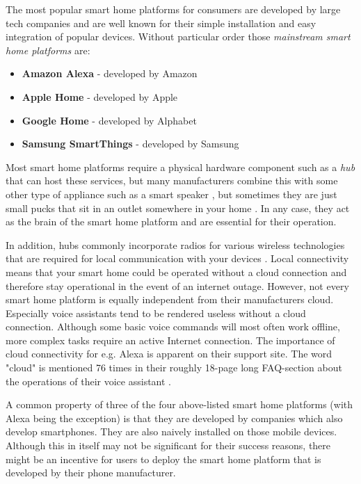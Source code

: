 The most popular smart home platforms for consumers are developed by large tech companies \cite{Tuohy2023SHP} and are well known for their simple installation and easy integration of popular devices. Without particular order those \textit{mainstream smart home platforms} are:
\begin{itemize}
    \item \textbf{Amazon Alexa} - developed by Amazon
    \item \textbf{Apple Home} - developed by Apple
    \item \textbf{Google Home} - developed by Alphabet
    \item \textbf{Samsung SmartThings} - developed by Samsung
\end{itemize}

Most smart home platforms require a physical hardware component such as a \textit{hub} \cite{BertkoChris2017HSH:} that can host these services, but many manufacturers combine this with some other type of appliance such as a smart speaker \cite{Tuohy2023SHP}, but sometimes they are just small pucks that sit in an outlet somewhere in your home \cite{Tuohy2023SHH}. In any case, they act as the brain of the smart home platform and are essential for their operation.

In addition, hubs commonly incorporate radios for various wireless technologies that are required for local communication with your devices \cite{Tuohy2023SHH}. Local connectivity means that your smart home could be operated without a cloud connection and therefore stay operational in the event of an internet outage. However, not every smart home platform is equally independent from their manufacturers cloud. Especially voice assistants tend to be rendered useless without a cloud connection. Although some basic voice commands will most often work offline, more complex tasks require an active Internet connection. The importance of cloud connectivity for e.g. Alexa is apparent on their support site. The word "cloud" is mentioned 76 times in their roughly 18-page long FAQ-section about the operations of their voice assistant \cite{AmazonAlexaFAQ}.

A common property of three of the four above-listed smart home platforms (with Alexa being the exception) is that they are developed by companies which also develop smartphones. They are also naively installed on those mobile devices. Although this in itself may not be significant for their success reasons, there might be an incentive for users to deploy the smart home platform that is developed by their phone manufacturer.

